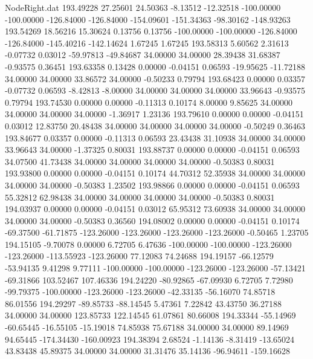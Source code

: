 \begin{filecontents}{NodeRight.dat}
 193.49228   27.25601   24.50363    -8.13512  -12.32518 -100.00000 -100.00000 -126.84000 -126.84000 -154.09601 -151.34363  -98.30162 -148.93263
 193.54269   18.56216   15.30624     0.13756    0.13756 -100.00000 -100.00000 -126.84000 -126.84000 -145.40216 -142.14624    1.67245    1.67245
 193.58313    5.60562    2.31613    -0.07732    0.03012  -59.97813  -49.84687   34.00000   34.00000   28.39438   31.68387   -0.93575    0.36451
 193.63358    0.13428    0.00000    -0.04151    0.06593  -19.95625  -11.72188   34.00000   34.00000   33.86572   34.00000   -0.50233    0.79794
 193.68423    0.00000    0.03357    -0.07732    0.06593   -8.42813   -8.00000   34.00000   34.00000   34.00000   33.96643   -0.93575    0.79794
 193.74530    0.00000    0.00000    -0.11313    0.10174    8.00000    9.85625   34.00000   34.00000   34.00000   34.00000   -1.36917    1.23136
 193.79610    0.00000    0.00000    -0.04151    0.03012   12.83750   20.48438   34.00000   34.00000   34.00000   34.00000   -0.50249    0.36463
 193.84677    0.03357    0.00000    -0.11313    0.06593   23.43438   31.10938   34.00000   34.00000   33.96643   34.00000   -1.37325    0.80031
 193.88737    0.00000    0.00000    -0.04151    0.06593   34.07500   41.73438   34.00000   34.00000   34.00000   34.00000   -0.50383    0.80031
 193.93800    0.00000    0.00000    -0.04151    0.10174   44.70312   52.35938   34.00000   34.00000   34.00000   34.00000   -0.50383    1.23502
 193.98866    0.00000    0.00000    -0.04151    0.06593   55.32812   62.98438   34.00000   34.00000   34.00000   34.00000   -0.50383    0.80031
 194.03937    0.00000    0.00000    -0.04151    0.03012   65.95312   73.60938   34.00000   34.00000   34.00000   34.00000   -0.50383    0.36560
 194.08002    0.00000    0.00000    -0.04151    0.10174  -69.37500  -61.71875 -123.26000 -123.26000 -123.26000 -123.26000   -0.50465    1.23705
 194.15105   -9.70078    0.00000     6.72705    6.47636 -100.00000 -100.00000 -123.26000 -123.26000 -113.55923 -123.26000   77.12083   74.24688
 194.19157  -66.12579  -53.94135     9.41298    9.77111 -100.00000 -100.00000 -123.26000 -123.26000  -57.13421  -69.31866  103.52467  107.46336
 194.24220  -80.92865  -67.09930     6.72705    7.72980  -99.79375 -100.00000 -123.26000 -123.26000  -42.33135  -56.16070   74.85718   86.01556
 194.29297  -89.85733  -88.14545     5.47361    7.22842   43.43750   36.27188   34.00000   34.00000  123.85733  122.14545   61.07861   80.66008
 194.33344  -55.14969  -60.65445   -16.55105  -15.19018   74.85938   75.67188   34.00000   34.00000   89.14969   94.65445 -174.34430 -160.00923
 194.38394    2.68524   -1.14136    -8.31419  -13.65024   43.83438   45.89375   34.00000   34.00000   31.31476   35.14136  -96.94611 -159.16628

\end{filecontents}
